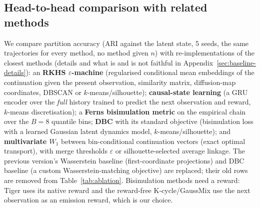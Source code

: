 \documentclass[10pt]{article}
\begin{document}
\subsection{Head-to-head comparison with related methods}
\label{sec:baselines}
We compare partition accuracy (ARI against the latent state, 5 seeds, the same
trajectories for every method, no method given $n$) with re-implementations of
the closest methods (details and what is and is not faithful in
Appendix~\ref{sec:baseline-details}):
an \textbf{RKHS $\varepsilon$-machine} \citep{Brodu2022} (regularised conditional
mean embeddings of the continuation given the present observation, similarity
matrix, diffusion-map coordinates, DBSCAN or $k$-means/silhouette);
\textbf{causal-state learning} \citep{Zhang2019causal} (a GRU encoder over the
\emph{full} history trained to predict the next observation and reward, $k$-means
discretisation); a \textbf{Ferns bisimulation metric} \citep{Ferns2004,Ferns2011}
on the empirical chain over the $B=8$ quantile bins; \textbf{DBC}
\citep{Zhang2020} with its standard objective (bisimulation loss with a learned
Gaussian latent dynamics model, $k$-means/silhouette); and \textbf{multivariate
$W_1$} between bin-conditional continuation vectors (exact optimal transport),
with merge thresholds $\varepsilon$ or silhouette-selected average linkage.  The
previous version's Wasserstein baseline (first-coordinate projections) and DBC
baseline (a custom Wasserstein-matching objective) are replaced; their old rows
are removed from Table~\ref{tab:ablation}.  Bisimulation methods need a reward:
Tiger uses its native reward and the reward-free K-cycle/GaussMix use the next
observation as an emission reward, which is our choice.
\end{document}

